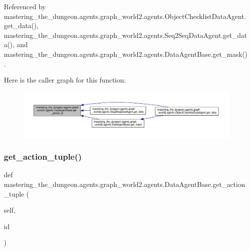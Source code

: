 Referenced by mastering\+\_\+the\+\_\+dungeon.\+agents.\+graph\+\_\+world2.\+agents.\+Object\+Checklist\+Data\+Agent.\+get\+\_\+data(), mastering\+\_\+the\+\_\+dungeon.\+agents.\+graph\+\_\+world2.\+agents.\+Seq2\+Seq\+Data\+Agent.\+get\+\_\+data(), and mastering\+\_\+the\+\_\+dungeon.\+agents.\+graph\+\_\+world2.\+agents.\+Data\+Agent\+Base.\+get\+\_\+mask().

Here is the caller graph for this function\+:
\nopagebreak
\begin{figure}[H]
\begin{center}
\leavevmode
\includegraphics[width=350pt]{classmastering__the__dungeon_1_1agents_1_1graph__world2_1_1agents_1_1DataAgentBase_a94accb6ae4ab603baef4d081cf731a84_icgraph}
\end{center}
\end{figure}
\mbox{\label{classmastering__the__dungeon_1_1agents_1_1graph__world2_1_1agents_1_1DataAgentBase_aa279284791dda3df9c07a8ad036a1f2e}} 
\subsubsection{\texorpdfstring{get\+\_\+action\+\_\+tuple()}{get\_action\_tuple()}}
{\footnotesize\ttfamily def mastering\+\_\+the\+\_\+dungeon.\+agents.\+graph\+\_\+world2.\+agents.\+Data\+Agent\+Base.\+get\+\_\+action\+\_\+tuple (\begin{DoxyParamCaption}\item[{}]{self,  }\item[{}]{id }\end{DoxyParamCaption})}



